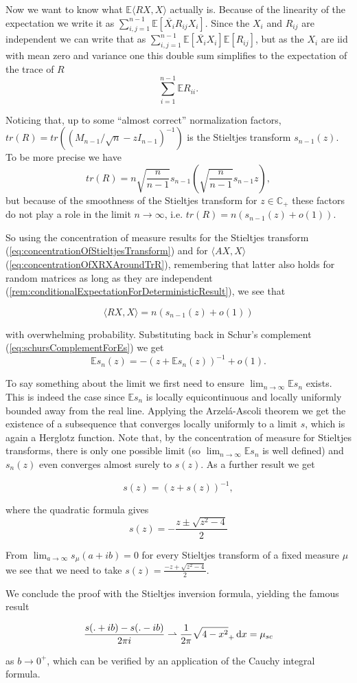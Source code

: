Now we want to know what $\mathbb E\langle RX,X\rangle$ actually is. Because of the linearity of the expectation we write it as $\sum_{i,j=1}^{n-1}\mathbb E[\overline{X_i}R_{ij}X_i]$. Since the $X_i$ and $R_{ij}$ are independent we can write that as $\sum_{i,j=1}^{n-1}\mathbb E[\overline{X_i}X_i]\mathbb E[R_{ij}]$, but as the $X_i$ are iid with mean zero and variance one this double sum simplifies to the expectation of the trace of $R$ $$\sum_{i=1}^{n-1}\mathbb ER_{ii}.$$

Noticing that, up to some ``almost correct'' normalization factors, $tr(R)=tr\left((M_{n-1}/\sqrt n-zI_{n-1})^{-1}\right)$ is the Stieltjes transform $s_{n-1}(z)$. To be more precise we have $$tr(R)=n\sqrt{\frac{n}{n-1}}s_{n-1}\left(\sqrt{\frac{n}{n-1}}s_{n-1}z\right),$$
but because of the smoothness of the Stieltjes transform for $z\in\mathbb C_+$ these factors do not play a role in the limit $n\rightarrow\infty$, i.e. $tr(R)=n(s_{n-1}(z)+o(1))$.

So using the concentration of measure results for the Stieltjes transform (\ref{eq:concentrationOfStieltjesTransform}) and for $\langle AX,X\rangle$(\ref{eq:concentrationOfXRXAroundTrR}), remembering that latter also holds for random matrices as long as they are independent (\ref{rem:conditionalExpectationForDeterministicResult}), we see that

$$\langle RX,X\rangle=n(s_{n-1}(z)+o(1))$$

with overwhelming probability. Substituting back in Schur's complement (\ref{eq:schursComplementForEs}) we get $$\mathbb Es_n(z)=-(z+\mathbb Es_n(z))^{-1}+o(1).$$

To say something about the limit we first need to ensure $\lim_{n\rightarrow\infty}\mathbb Es_n$ exists. This is indeed the case since $\mathbb Es_n$ is locally equicontinuous and locally uniformly bounded away from the real line. Applying the Arzel\'{a}-Ascoli theorem we get the existence of a subsequence that converges locally uniformly to a limit $s$, which is again a Herglotz function. Note that, by the concentration of measure for Stieltjes transforms, there is only one possible limit (so $\lim_{n\rightarrow\infty}\mathbb Es_n$ is well defined) and $s_n(z)$ even converges almost surely to $s(z)$. As a further result we get

$$s(z)=(z+s(z))^{-1},$$

where the quadratic formula gives $$s(z)=-\frac{z\pm\sqrt{z^2-4}}{2}$$

From $\lim_{a\rightarrow\infty}s_\mu(a+ib)=0$ for every Stieltjes transform of a fixed measure $\mu$ we see that we need to take $s(z)=\frac{-z+\sqrt{z^2-4}}{2}$.

We conclude the proof with the Stieltjes inversion formula, yielding the famous result

$$\frac{s(.+ib)-s(.-ib)}{2\pi i}\rightharpoonup\frac{1}{2\pi}\sqrt{4-x^2}_+\mathop{}\!\mathrm{d} x=\mu_{sc}$$

as $b\rightarrow 0^+$, which can be verified by an application of the Cauchy integral formula.
















